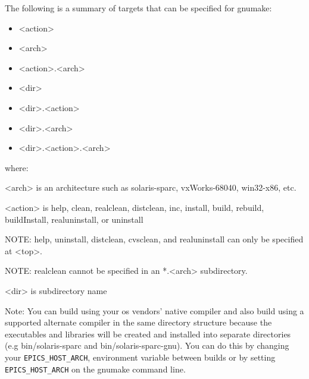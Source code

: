 The following is a summary of targets that can be specified for gnumake: 

\begin{itemize}\item \textless{}action\textgreater{}

\item \textless{}arch\textgreater{}

\item \textless{}action\textgreater{}.\textless{}arch\textgreater{}

\item \textless{}dir\textgreater{}

\item \textless{}dir\textgreater{}.\textless{}action\textgreater{}

\item  \textless{}dir\textgreater{}.\textless{}arch\textgreater{}

\item \textless{}dir\textgreater{}.\textless{}action\textgreater{}.\textless{}arch\textgreater{}

\end{itemize}where: 

\begin{description}\item \textless{}arch\textgreater{} is an architecture such as solaris-sparc, vxWorks-68040, win32-x86, etc.

\item \textless{}action\textgreater{} is help, clean, realclean, distclean, inc, install, build, rebuild, buildInstall, realuninstall, or uninstall

\item NOTE: help, uninstall, distclean, cvsclean, and realuninstall can only be specified at \textless{}top\textgreater{}.

\item NOTE: realclean cannot be specified in an *.\textless{}arch\textgreater{} subdirectory.

\item \textless{}dir\textgreater{} is subdirectory name

\end{description}Note: You can build using your os vendors' native compiler and also build using a supported alternate compiler in the 
same directory structure because the executables and libraries will be created and installed into separate directories (e.g 
bin/solaris-sparc and bin/solaris-sparc-gnu). You can do this by changing your \verb|EPICS_HOST_ARCH|, environment 
variable between builds or by setting \verb|EPICS_HOST_ARCH| on the gnumake command line.

